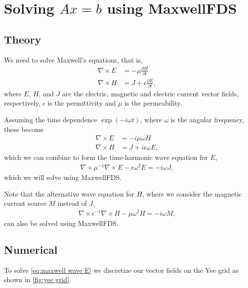 \documentclass{book}
\newcommand{\E}[2]{\begin{align}#2\end{align}\label{eq:#1}}
\newcommand{\EE}[2]{\begin{subequations}\begin{align}#2\end{align}\label{eq:#1}\end{subequations}}
\newcommand{\curl}{\nabla\times}
\newcommand{\eq}[1]{\eqref{eq:#1}}
\newcommand{\fig}[1]{\ref{fig:#1}}
\begin{document}
\section{Solving $Ax=b$ using MaxwellFDS}
\subsection{Theory}
We need to solve Maxwell's equations, that is,
\EE {maxwell diff}
    {\curl E &= - \mu \frac{\partial H}{\partial t} \\
    \curl H &= J + \epsilon \frac{\partial E}{\partial t}, }
    where $E$, $H$, and $J$ are 
    the electric, magnetic and electric current
    vector fields, respectively,
    $\epsilon$ is the permittivity
    and $\mu$ is the permeability.

Assuming the time dependence $\exp(-i \omega t)$, 
    where $\omega$ is the angular frequency,
    these become
\EE {maxwell harmonic}
    {\curl E &= - i \mu \omega H \\
    \curl H &= J + i \epsilon \omega E,}
    which we can combine to form the time-harmonic wave equation for $E$,
    \E{maxwell wave E}
    {\curl \mu^{-1} \curl E - \epsilon \omega^2 E = -i \omega J,}
    which we will solve using MaxwellFDS.

Note that the alternative wave equation for $H$,
    where we consider the magnetic current source $M$
    instead of $J$,
\E  {maxwell wave H}
    {\curl \epsilon^{-1} \curl H - \mu \omega^2 H = -i \omega M,}
    can also be solved using MaxwellFDS.

\subsection{Numerical}
To solve \eq{maxwell wave E} we discretize our vector fields on the Yee grid
    as shown in \fig{yee grid}.
\end{document}
